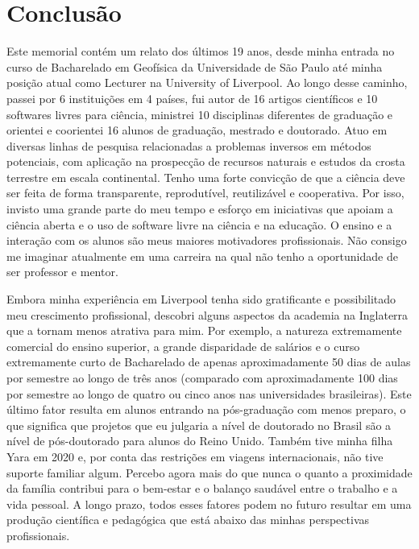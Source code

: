 \documentclass[10pt,a4paper,oneside]{book}
\begin{document}
\chapter{Conclusão}
\label{cap_conclusao}

Este memorial contém um relato dos últimos 19 anos, desde minha entrada no
curso de Bacharelado em Geofísica da Universidade de São Paulo até minha
posição atual como Lecturer na University of Liverpool.
Ao longo desse caminho, passei por 6 instituições em 4 países, fui autor de 16
artigos científicos e 10 softwares livres para ciência, ministrei 10
disciplinas diferentes de graduação e orientei e coorientei 16 alunos de
graduação, mestrado e doutorado.
Atuo em diversas linhas de pesquisa relacionadas a problemas inversos em
métodos potenciais, com aplicação na prospecção de recursos naturais e estudos
da crosta terrestre em escala continental.
Tenho uma forte convicção de que a ciência deve ser feita de forma
transparente, reprodutível, reutilizável e cooperativa.
Por isso, invisto uma grande parte do meu tempo e esforço em iniciativas que
apoiam a ciência aberta e o uso de software livre na ciência e na educação.
O ensino e a interação com os alunos são meus maiores motivadores
profissionais.
Não consigo me imaginar atualmente em uma carreira na qual não tenho a
oportunidade de ser professor e mentor.

Embora minha experiência em Liverpool tenha sido gratificante e possibilitado
meu crescimento profissional, descobri alguns aspectos da academia na
Inglaterra que a tornam menos atrativa para mim.
Por exemplo, a natureza extremamente comercial do ensino superior, a grande
disparidade de salários e o curso extremamente curto de Bacharelado de apenas
aproximadamente 50 dias de aulas por semestre ao longo de três anos (comparado
com aproximadamente 100 dias por semestre ao longo de quatro ou cinco anos nas
universidades brasileiras).
Este último fator resulta em alunos entrando na pós-graduação com menos
preparo, o que significa que projetos que eu julgaria a nível de doutorado no
Brasil são a nível de pós-doutorado para alunos do Reino Unido.
Também tive minha filha Yara em 2020 e, por conta das restrições em viagens
internacionais, não tive suporte familiar algum.
Percebo agora mais do que nunca o quanto a proximidade da família contribui
para o bem-estar e o balanço saudável entre o trabalho e a vida pessoal.
A longo prazo, todos esses fatores podem no futuro resultar em uma produção
científica e pedagógica que está abaixo das minhas perspectivas profissionais.
\end{document}
